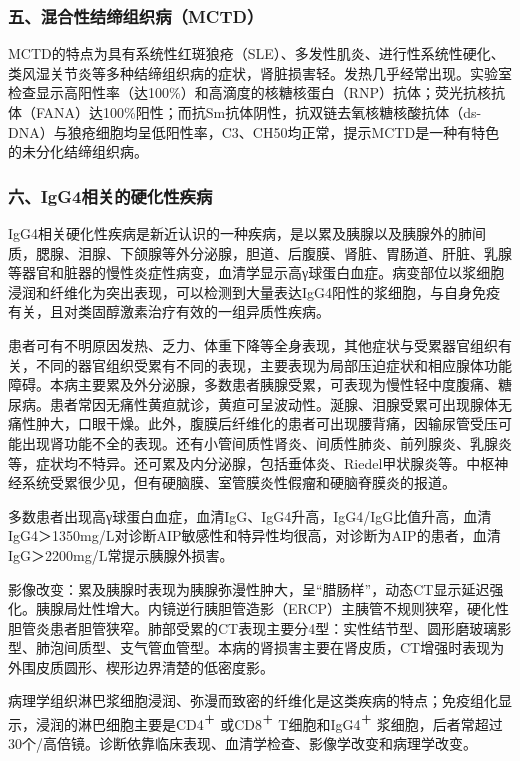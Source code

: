 \subsubsection{五、混合性结缔组织病（MCTD）}

MCTD的特点为具有系统性红斑狼疮（SLE）、多发性肌炎、进行性系统性硬化、类风湿关节炎等多种结缔组织病的症状，肾脏损害轻。发热几乎经常出现。实验室检查显示高阳性率（达100\%）和高滴度的核糖核蛋白（RNP）抗体；荧光抗核抗体（FANA）达100\%阳性；而抗Sm抗体阴性，抗双链去氧核糖核酸抗体（ds-DNA）与狼疮细胞均呈低阳性率，C3、CH50均正常，提示MCTD是一种有特色的未分化结缔组织病。

\subsubsection{六、IgG4相关的硬化性疾病}

IgG4相关硬化性疾病是新近认识的一种疾病，是以累及胰腺以及胰腺外的肺间质，腮腺、泪腺、下颌腺等外分泌腺，胆道、后腹膜、肾脏、胃肠道、肝脏、乳腺等器官和脏器的慢性炎症性病变，血清学显示高γ球蛋白血症。病变部位以浆细胞浸润和纤维化为突出表现，可以检测到大量表达IgG4阳性的浆细胞，与自身免疫有关，且对类固醇激素治疗有效的一组异质性疾病。

患者可有不明原因发热、乏力、体重下降等全身表现，其他症状与受累器官组织有关，不同的器官组织受累有不同的表现，主要表现为局部压迫症状和相应腺体功能障碍。本病主要累及外分泌腺，多数患者胰腺受累，可表现为慢性轻中度腹痛、糖尿病。患者常因无痛性黄疸就诊，黄疸可呈波动性。涎腺、泪腺受累可出现腺体无痛性肿大，口眼干燥。此外，腹膜后纤维化的患者可出现腰背痛，因输尿管受压可能出现肾功能不全的表现。还有小管间质性肾炎、间质性肺炎、前列腺炎、乳腺炎等，症状均不特异。还可累及内分泌腺，包括垂体炎、Riedel甲状腺炎等。中枢神经系统受累很少见，但有硬脑膜、室管膜炎性假瘤和硬脑脊膜炎的报道。

多数患者出现高γ球蛋白血症，血清IgG、IgG4升高，IgG4/IgG比值升高，血清IgG4＞1350mg/L对诊断AIP敏感性和特异性均很高，对诊断为AIP的患者，血清IgG＞2200mg/L常提示胰腺外损害。

影像改变：累及胰腺时表现为胰腺弥漫性肿大，呈“腊肠样”，动态CT显示延迟强化。胰腺局灶性增大。内镜逆行胰胆管造影（ERCP）主胰管不规则狭窄，硬化性胆管炎患者胆管狭窄。肺部受累的CT表现主要分4型：实性结节型、圆形磨玻璃影型、肺泡间质型、支气管血管型。本病的肾损害主要在肾皮质，CT增强时表现为外围皮质圆形、楔形边界清楚的低密度影。

病理学组织淋巴浆细胞浸润、弥漫而致密的纤维化是这类疾病的特点；免疫组化显示，浸润的淋巴细胞主要是CD4\textsuperscript{＋}
或CD8\textsuperscript{＋} T细胞和IgG4\textsuperscript{＋}
浆细胞，后者常超过30个/高倍镜。诊断依靠临床表现、血清学检查、影像学改变和病理学改变。

